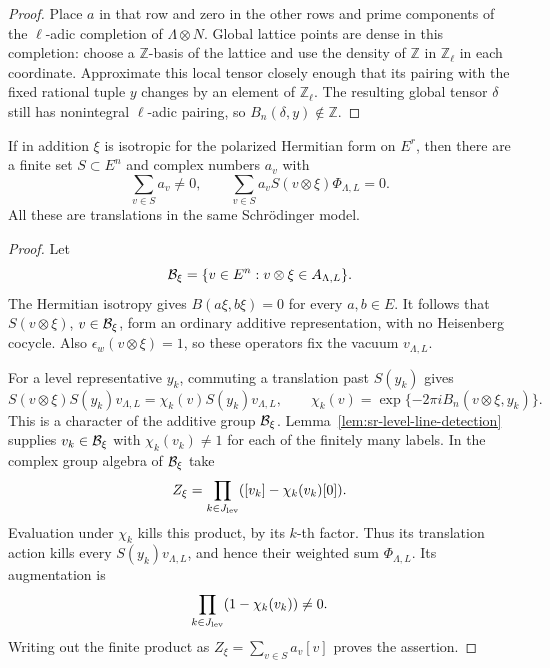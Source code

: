 \begin{proof}
Place \(a\) in that row and zero in the other rows and prime
components of the \(\ell\)-adic completion of
\(\Lambda\otimes N\).
Global lattice points are dense in this completion: choose a
\(\mathbb Z\)-basis of the lattice and use the density of
\(\mathbb Z\) in \(\mathbb Z_\ell\) in each coordinate.
Approximate this local tensor closely enough that its pairing
with the fixed rational tuple \(y\) changes by an element of
\(\mathbb Z_\ell\).
The resulting global tensor \(\delta\) still has nonintegral
\(\ell\)-adic pairing, so \(B_n(\delta,y)\notin\mathbb Z\).
\end{proof}

\begin{srproposition}\label{prop:sr-level-isotropic-relation}
If in addition \(\xi\) is isotropic for the polarized
Hermitian form on \(E^r\), then there are a finite set
\(S\subset E^n\) and complex numbers \(a_v\) with
\[
 \sum_{v\in S}a_v\ne0,\qquad
 \sum_{v\in S}a_v S(v\otimes\xi)\Phi_{\Lambda,L}=0 .
\]
All these are translations in the same Schr\"odinger model.
\end{srproposition}

\begin{proof}
Let
\[
 {\cal B}_\xi=\{v\in E^n:v\otimes\xi\in A_{\Lambda,L}\}.
\]
The Hermitian isotropy gives
\(B(a\xi,b\xi)=0\) for every \(a,b\in E\).
It follows that \(S(v\otimes\xi)\), \(v\in{\cal B}_\xi\),
form an ordinary additive representation, with no Heisenberg
cocycle.  Also
\(\epsilon_w(v\otimes\xi)=1\), so these operators fix the
vacuum \(v_{\Lambda,L}\).

For a level representative \(y_k\), commuting a translation
past \(S(y_k)\) gives
\[
 S(v\otimes\xi)S(y_k)v_{\Lambda,L}
   =\chi_k(v)S(y_k)v_{\Lambda,L},\qquad
 \chi_k(v)=\exp\{-2\pi iB_n(v\otimes\xi,y_k)\}.
\]
This is a character of the additive group
\({\cal B}_\xi\).
Lemma~\ref{lem:sr-level-line-detection} supplies
\(v_k\in{\cal B}_\xi\) with \(\chi_k(v_k)\ne1\)
for each of the finitely many labels.
In the complex group algebra of \({\cal B}_\xi\) take
\[
 Z_\xi=\prod_{k\in J_{\rm lev}}
                   ([v_k]-\chi_k(v_k)[0]).
\]
Evaluation under \(\chi_k\) kills this product, by its
\(k\)-th factor.  Thus its translation action kills every
\(S(y_k)v_{\Lambda,L}\), and hence their weighted sum
\(\Phi_{\Lambda,L}\).
Its augmentation is
\[
       \prod_{k\in J_{\rm lev}}(1-\chi_k(v_k))\ne0 .
\]
Writing out the finite product as
\(Z_\xi=\sum_{v\in S}a_v[v]\) proves the assertion.
\end{proof}

